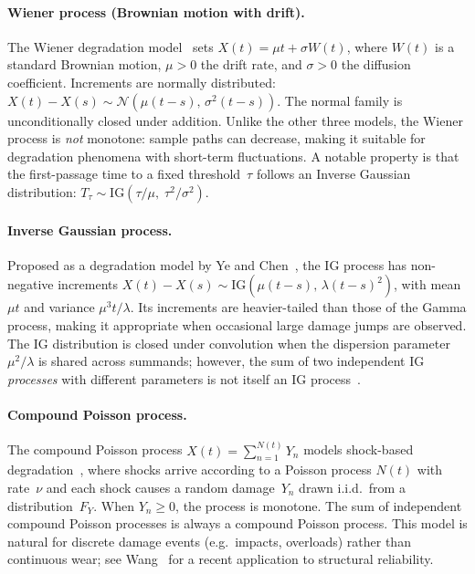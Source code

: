 \documentclass[11pt,a4paper]{article}
\theoremstyle{plain}
\theoremstyle{definition}
\theoremstyle{remark}
\begin{document}
\paragraph{Wiener process (Brownian motion with drift).}
The Wiener degradation model~\cite{WhitmoreSchenkelberg1997} sets $X(t) = \mu t + \sigma W(t)$, where $W(t)$ is a standard Brownian motion, $\mu>0$ the drift rate, and $\sigma>0$ the diffusion coefficient.
Increments are normally distributed: $X(t)-X(s) \sim \mathcal{N}(\mu(t-s),\,\sigma^2(t-s))$.
The normal family is unconditionally closed under addition.
Unlike the other three models, the Wiener process is \emph{not} monotone: sample paths can decrease, making it suitable for degradation phenomena with short-term fluctuations.
A notable property is that the first-passage time to a fixed threshold~$\tau$ follows an Inverse Gaussian distribution: $T_\tau \sim \mathrm{IG}(\tau/\mu,\;\tau^2/\sigma^2)$.

\paragraph{Inverse Gaussian process.}
Proposed as a degradation model by Ye and Chen~\cite{YeChen2014}, the IG process has non-negative increments $X(t)-X(s) \sim \mathrm{IG}(\mu(t-s),\,\lambda(t-s)^2)$, with mean $\mu t$ and variance $\mu^3 t/\lambda$.
Its increments are heavier-tailed than those of the Gamma process, making it appropriate when occasional large damage jumps are observed.
The IG distribution is closed under convolution when the dispersion parameter $\mu^2/\lambda$ is shared across summands; however, the sum of two independent IG \emph{processes} with different parameters is not itself an IG process~\cite{YeChen2014}.

\paragraph{Compound Poisson process.}
The compound Poisson process $X(t) = \sum_{n=1}^{N(t)} Y_n$ models shock-based degradation~\cite{EsaryMarshallProschan1973}, where shocks arrive according to a Poisson process $N(t)$ with rate~$\nu$ and each shock causes a random damage~$Y_n$ drawn i.i.d.\ from a distribution~$F_Y$.
When $Y_n \ge 0$, the process is monotone.
The sum of independent compound Poisson processes is always a compound Poisson process.
This model is natural for discrete damage events (e.g.\ impacts, overloads) rather than continuous wear; see Wang~\cite{Wang2022} for a recent application to structural reliability.
\end{document}
